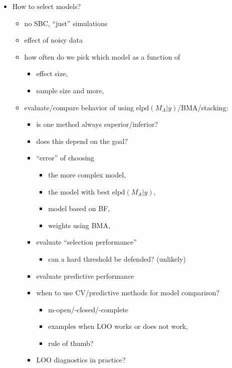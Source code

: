 \begin{itemize}
\tightlist
\item
  How to select models?

  \begin{itemize}
  \tightlist
  \item
    no SBC, ``just'' simulations
  \item
    effect of noisy data
  \item
    how often do we pick which model as a function of

    \begin{itemize}
    \tightlist
    \item
      effect size,
    \item
      sample size and more,
    \end{itemize}
  \item
    evaluate/compare behavior of using
    \(\mathrm{elpd}(M_A | y)\)/BMA/stacking:

    \begin{itemize}
    \tightlist
    \item
      is one method always superior/inferior?
    \item
      does this depend on the goal?
    \item
      ``error'' of choosing

      \begin{itemize}
      \tightlist
      \item
        the more complex model,
      \item
        the model with best \(\mathrm{elpd}(M_A | y)\),
      \item
        model based on BF,
      \item
        weights using BMA,
      \end{itemize}
    \item
      evaluate ``selection performance''

      \begin{itemize}
      \tightlist
      \item
        can a hard threshold be defended? (unlikely)
      \end{itemize}
    \item
      evaluate predictive performance
    \item
      when to use CV/predictive methods for model comparison?

      \begin{itemize}
      \tightlist
      \item
        m-open/-closed/-complete
      \item
        examples when LOO works or does not work,
      \item
        rule of thumb?
      \end{itemize}
    \item
      LOO diagnostics in practice?


\end{itemize}
\end{itemize}
\end{itemize}
